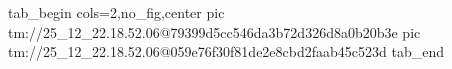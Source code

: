  
 
 
 
 

\qqSecOrig


\ifcmt
  tab_begin cols=2,no_fig,center
    pic tm://25_12_22.18.52.06@79399d5cc546da3b72d326d8a0b20b3e
    pic tm://25_12_22.18.52.06@059e76f30f81de2e8cbd2faab45c523d
  tab_end
\fi

